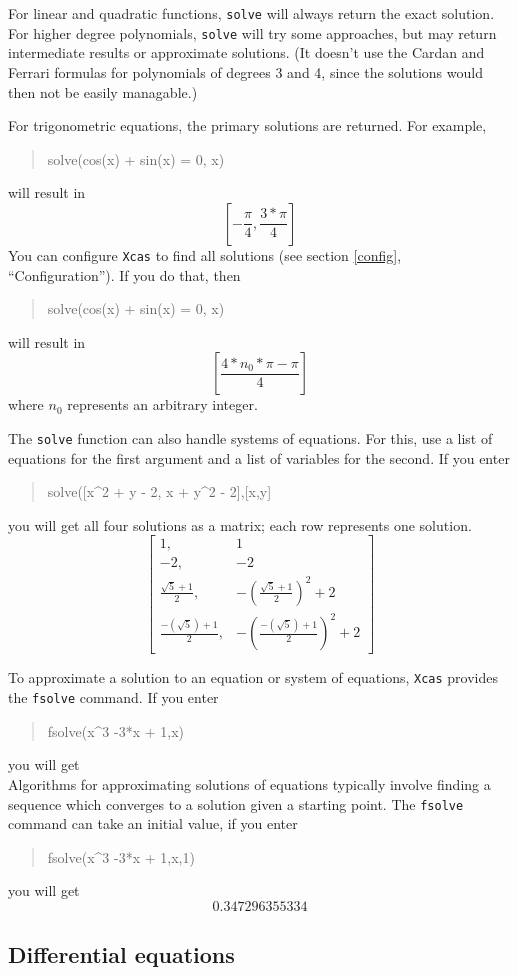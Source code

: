 \documentclass{article}
\newcommand{\xcasin}[1]
{\begin{quote}\ttfamily
#1
\end{quote}}
\newcommand{\xcasout}[1]
{\begin{equation*}
#1
\end{equation*}}
\begin{document}
For linear and quadratic functions, \texttt{solve} will always return
the exact solution.  For higher degree polynomials, \texttt{solve}
will try some approaches, but may return intermediate results or
approximate solutions.  (It doesn't use the Cardan and Ferrari
formulas for polynomials of degrees 3 and 4, since the solutions would
then not be easily managable.)

For trigonometric equations, the primary solutions are returned.  For
example,
\xcasin{solve(cos(x) + sin(x) = 0, x)}
will result in
\xcasout{\left[-\frac{\pi}{4},\frac{3*\pi}{4}\right]}
You can configure \texttt{Xcas} to find all solutions (see section
\ref{config}, ``Configuration'').  If you do that, then
\xcasin{solve(cos(x) + sin(x) = 0, x)}
will result in
\xcasout{\left[\frac{4*n_0*\pi-\pi}{4}\right]}
where $n_0$ represents an arbitrary integer.

The \texttt{solve} function can also handle systems of equations.
For this, use a list of equations for the first argument and a list of
variables for the second.  If you enter
\xcasin{solve([x\^{}2 + y - 2, x + y\^{}2 - 2],[x,y]}
you will get all four solutions as a matrix; each row represents one
solution.
\xcasout{
\left[\begin{matrix}1,& 1\\ -2,& -2\\ \frac{\sqrt{5}+1}{2}, &
-\left(\frac{\sqrt{5}+1}{2}\right)^2 + 2\\
\frac{-(\sqrt{5})+1}{2}, &
-\left(\frac{-(\sqrt{5})+1}{2}\right)^2 + 2
\end{matrix}\right]}

To approximate a solution to an equation or system of equations,
\texttt{Xcas} provides the \texttt{fsolve} command.  If you enter
\xcasin{fsolve(x\^{}3 -3*x + 1,x)}
you will get
\xcasout{[-1.87938524157,0.347296355334,1.53208888624]}
Algorithms for approximating solutions of equations 
typically involve finding a sequence which converges to a
solution given a starting point.  The \texttt{fsolve} command can take
an initial value, if you enter
\xcasin{fsolve(x\^{}3 -3*x + 1,x,1)}
you will get
\xcasout{0.347296355334}


\subsection{Differential equations}
\end{document}
